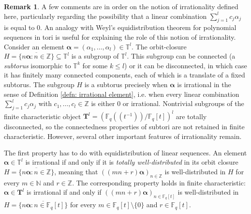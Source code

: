 \documentclass{amsart}
\theoremstyle{definition}
\newtheorem{remark}[theorem]{Remark}
\numberwithin{equation}{section}
\newcommand{\N}{\mathbb{N}}
\newcommand{\Z}{\mathbb{Z}}
\newcommand{\T}{\mathbb{T}}
\newcommand{\F}{\mathbb{F}}
\begin{document}
\begin{remark}
    A few comments are in order on the notion of irrationality defined here, particularly regarding the possibility that a linear combination $\sum_{j=1}^l c_j \alpha_j$ is equal to 0.
    An analogy with Weyl's equidistribution theorem for polynomial sequences in tori is useful for explaining the role of this notion of irrationality.
    Consider an element $\bm{\alpha} = (\alpha_1, \ldots, \alpha_l) \in \T^l$.
    The orbit-closure $H = \overline{\{n\bm{\alpha} : n \in \Z\}} \subseteq \T^{l}$ is a subgroup of $\T^{l}$.
    This subgroup can be connected (a \emph{subtorus} isomorphic to $\T^k$ for some $k \le l$) or it can be disconnected, in which case it has finitely many connected components, each of which is a translate of a fixed subtorus.
    The subgroup $H$ is a subtorus precisely when $\bm{\alpha}$ is irrational in the sense of Definition \ref{defn: irrational element}, i.e. when every linear combination $\sum_{j=1}^l c_j \alpha_j$ with $c_1, \ldots, c_l \in \Z$ is either 0 or irrational.
    Nontrivial subgroups of the finite characteristic object $\mathbf{T}^l = (\F_q((t^{-1}))/\F_q[t])^l$ are totally disconnected, so the connectedness properties of subtori are not retained in finite characteristic.
    However, several other important features of irrationality remain.

    The first property has to do with equidistribution of linear sequences.
    An element $\bm{\alpha} \in \T^l$ is irrational if and only if it is \emph{totally well-distributed} in its orbit closure $H = \overline{\{n\bm{\alpha} : n \in \Z\}}$, meaning that $((mn+r)\bm{\alpha})_{n \in \Z}$ is well-distributed in $H$ for every $m \in \N$ and $r \in \Z$.
    The corresponding property holds in finite characteristic: $\bm{\alpha} \in \mathbf{T}^l$ is irrational if and only if $((mn+r)\bm{\alpha})_{n \in \F_q[t]}$ is well-distributed in $H = \overline{\{n\bm{\alpha} : n \in \F_q[t]\}}$ for every $m \in \F_q[t] \setminus \{0\}$ and $r \in \F_q[t]$.


\end{remark}
\end{document}
